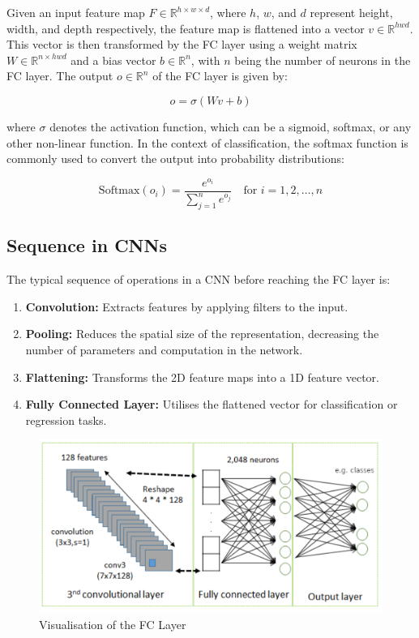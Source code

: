 Given an input feature map $F \in \mathbb{R}^{h \times w \times d}$, where $h$, $w$, and $d$ represent height, width, and depth respectively, the feature map is flattened into a vector $v \in \mathbb{R}^{hwd}$.\\

This vector is then transformed by the FC layer using a weight matrix $W \in \mathbb{R}^{n \times hwd}$ and a bias vector $b \in \mathbb{R}^{n}$, with $n$ being the number of neurons in the FC layer. The output $o \in \mathbb{R}^{n}$ of the FC layer is given by:

\begin{equation}
o = \sigma(Wv + b)
\end{equation}

where $\sigma$ denotes the activation function, which can be a sigmoid, softmax, or any other non-linear function. In the context of classification, the softmax function is commonly used to convert the output into probability distributions:

\begin{equation}
\text{Softmax}(o_i) = \frac{e^{o_i}}{\sum_{j=1}^{n} e^{o_j}} \quad \text{for } i=1,2,\ldots,n
\end{equation}

\subsection*{Sequence in CNNs}

The typical sequence of operations in a CNN before reaching the FC layer is:

\begin{enumerate}
\item \textbf{Convolution:} Extracts features by applying filters to the input.
\item \textbf{Pooling:} Reduces the spatial size of the representation, decreasing the number of parameters and computation in the network.
\item \textbf{Flattening:} Transforms the 2D feature maps into a 1D feature vector.
\item \textbf{Fully Connected Layer:} Utilises the flattened vector for classification or regression tasks.
\end{enumerate}

\begin{figure}
    \centering
    \includegraphics[width=0.75\linewidth]{img/FC.png}
    \caption{Visualisation of the FC Layer} 
\end{figure}

